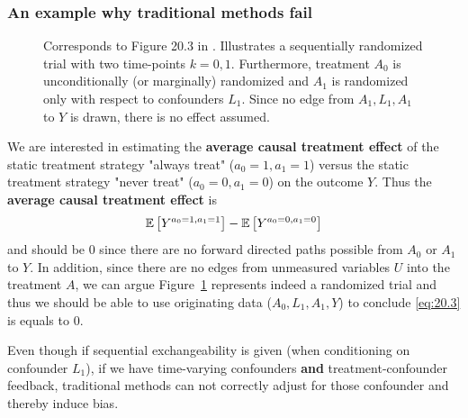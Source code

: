 \documentclass[11pt,a4paper,twoside]{book}\usepackage[]{graphicx}\usepackage[]{xcolor}
\begin{document}
\subsubsection{An example why traditional methods fail}

\begin{figure}[H]
\centering
{}
\caption{Corresponds to Figure 20.3 in \cite{hernan2023}. 
Illustrates a sequentially randomized trial with two time-points $k=0,1$. Furthermore, treatment $A_0$ is unconditionally (or marginally) randomized and $A_1$ is randomized only with respect to confounders $L_1$. 
Since no edge from $A_1, L_1, A_1$ to $Y$ is drawn, there is no effect assumed.
}\label{fig:20.3}
\end{figure}

We are interested in estimating the \textbf{average causal treatment effect} of the static treatment strategy "always treat" ($a_0=1,a_1=1$) versus the static treatment strategy "never treat" ($a_0=0,a_1=0$) on the outcome $Y$. Thus the \textbf{average causal treatment effect} is 
\begin{align}
\operatorname{\mathbb{E}}\left[Y^{a_0=1,a_1=1}\right]-\operatorname{\mathbb{E}}\left[Y^{a_0=0,a_1=0}\right] \label{eq:20.3}
\end{align}
and should be 0 since there are no forward directed paths possible from $A_0$ or $A_1$ to $Y$. In addition, since there are no edges from unmeasured variables $U$ into the treatment $A$, we can argue Figure~\ref{fig:20.3} represents indeed a randomized trial and thus we should be able to use originating data ($A_0, L_1, A_1, Y$) to conclude \eqref{eq:20.3} is equals to 0.


Even though if sequential exchangeability is given (when conditioning on confounder $L_1$), if we have time-varying confounders \textbf{and} treatment-confounder feedback, traditional methods can not correctly adjust for those confounder and thereby induce bias.
\end{document}
